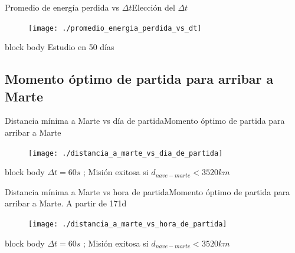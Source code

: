 \documentclass{beamer}
\begin{document}
            \begin{frame}{Promedio de energía perdida vs $\Delta t$}{Elección del $\Delta t$}
                \begin{figure}[H!]
                    \texttt{[image: ./promedio\_energia\_perdida\_vs\_dt]}
                    \label{fig:marte_4}
                \end{figure}
                \begin{beamercolorbox}[sep=5pt,center]{block body}
                    \centering
                    \small{Estudio en 50 días}
                \end{beamercolorbox}
            \end{frame}

        \subsection{Momento óptimo de partida para arribar a Marte}

            \begin{frame}{Distancia mínima a Marte vs día de partida}{Momento óptimo de partida para arribar a Marte}
                \begin{figure}[H!]
                    \texttt{[image: ./distancia\_a\_marte\_vs\_dia\_de\_partida]}
                    \label{fig:marte_5}
                \end{figure}
                \begin{beamercolorbox}[sep=5pt,center]{block body}
                    \centering
                    \small{$\Delta t = 60s$ ; Misión exitosa si $d_{nave-marte} < 3520 km$}
                \end{beamercolorbox}
            \end{frame}

            \begin{frame}{Distancia mínima a Marte vs hora de partida}{Momento óptimo de partida para arribar a Marte. A partir de 171d}
                \begin{figure}[H!]
                    \texttt{[image: ./distancia\_a\_marte\_vs\_hora\_de\_partida]}
                    \label{fig:marte_6}
                \end{figure}
                \begin{beamercolorbox}[sep=5pt,center]{block body}
                    \centering
                    \small{$\Delta t = 60s$ ; Misión exitosa si $d_{nave-marte} < 3520 km$}
                \end{beamercolorbox}
            \end{frame}
\end{document}
